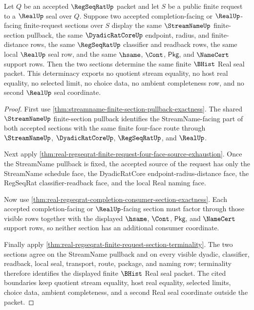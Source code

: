 \begin{theorem}
\label{thm:real-regseqrat-finite-request-determinacy}
Let $Q$ be an accepted $\RegSeqRatUp$ packet and let $S$ be a public finite request to a $\RealUp$ seal over $Q$. Suppose two accepted completion-facing or $\RealUp$-facing finite-request sections over $S$ display the same $\StreamNameUp$ finite-section pullback, the same $\DyadicRatCoreUp$ endpoint, radius, and finite-distance rows, the same $\RegSeqRatUp$ classifier and readback rows, the same local $\RealUp$ seal row, and the same $\hsame$, $\Cont$, $\mathsf{Pkg}$, and $\NameCert$ support rows. Then the two sections determine the same finite $\BHist$ Real seal packet. This determinacy exports no quotient stream equality, no host real equality, no selected limit, no choice data, no ambient completeness row, and no second $\RealUp$ seal coordinate.
\end{theorem}
\begin{proof}
First use \autoref{thm:streamname-finite-section-pullback-exactness}. The shared $\StreamNameUp$ finite-section pullback identifies the StreamName-facing part of both accepted sections with the same finite four-face route through $\StreamNameUp$, $\DyadicRatCoreUp$, $\RegSeqRatUp$, and $\RealUp$.

Next apply \autoref{thm:real-regseqrat-finite-request-four-face-source-exhaustion}. Once the StreamName pullback is fixed, the accepted source of the request has only the StreamName schedule face, the DyadicRatCore endpoint-radius-distance face, the RegSeqRat classifier-readback face, and the local Real naming face.

Now use \autoref{thm:real-regseqrat-completion-consumer-section-exactness}. Each accepted completion-facing or $\RealUp$-facing section must factor through those visible rows together with the displayed $\hsame$, $\Cont$, $\mathsf{Pkg}$, and $\NameCert$ support rows, so neither section has an additional consumer coordinate.

Finally apply \autoref{thm:real-regseqrat-finite-request-section-terminality}. The two sections agree on the StreamName pullback and on every visible dyadic, classifier, readback, local seal, transport, route, package, and naming row; terminality therefore identifies the displayed finite $\BHist$ Real seal packet. The cited boundaries keep quotient stream equality, host real equality, selected limits, choice data, ambient completeness, and a second Real seal coordinate outside the packet.
\end{proof}

